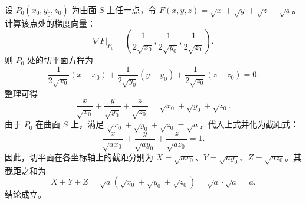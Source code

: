 \begin{solution}

    设 $P_0(x_0, y_0, z_0)$ 为曲面 $S$ 上任一点，令 $F(x, y, z) = \sqrt{x} + \sqrt{y} + \sqrt{z} - \sqrt{a}$。计算该点处的梯度向量：
    \begin{equation}
        \nabla F\big|_{P_0} = \left( \frac{1}{2\sqrt{x_0}}, \frac{1}{2\sqrt{y_0}}, \frac{1}{2\sqrt{z_0}} \right).
    \end{equation}
    则 $P_0$ 处的切平面方程为
    \begin{equation}
        \frac{1}{2\sqrt{x_0}}(x - x_0) + \frac{1}{2\sqrt{y_0}}(y - y_0) + \frac{1}{2\sqrt{z_0}}(z - z_0) = 0.
    \end{equation}
    整理可得
    \begin{equation}
        \frac{x}{\sqrt{x_0}} + \frac{y}{\sqrt{y_0}} + \frac{z}{\sqrt{z_0}} = \sqrt{x_0} + \sqrt{y_0} + \sqrt{z_0}.
    \end{equation}
    由于 $P_0$ 在曲面 $S$ 上，满足 $\sqrt{x_0} + \sqrt{y_0} + \sqrt{z_0} = \sqrt{a}$，代入上式并化为截距式：
    \begin{equation}
        \frac{x}{\sqrt{ax_0}} + \frac{y}{\sqrt{ay_0}} + \frac{z}{\sqrt{az_0}} = 1.
    \end{equation}
    因此，切平面在各坐标轴上的截距分别为 $X = \sqrt{ax_0}$、$Y = \sqrt{ay_0}$、$Z = \sqrt{az_0}$。其截距之和为
    \begin{equation}
        X + Y + Z = \sqrt{a}(\sqrt{x_0} + \sqrt{y_0} + \sqrt{z_0}) = \sqrt{a} \cdot \sqrt{a} = a.
    \end{equation}
    结论成立。



\end{solution}
